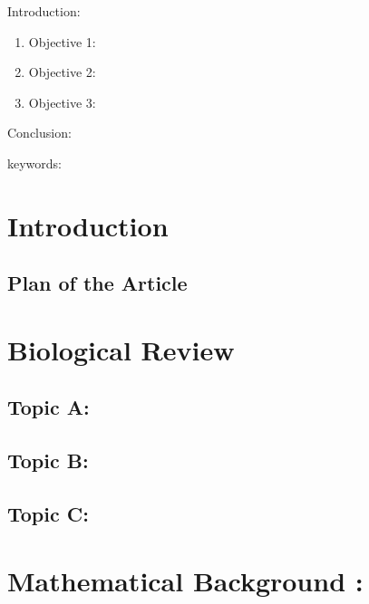 

\twocolumn
\scriptsize
\begin{frontmatter}
		\title{}
		\author{}
		\address{The Mathematical Learning Space}
\end{frontmatter}	

Introduction:
\begin{enumerate}
\item Objective 1:
\item Objective 2:
\item Objective 3:
\end{enumerate}
Conclusion:

keywords:


\section{Introduction}

\subsection{Plan of the Article}

\begin{enumerate}
\end{enumerate}


\section{Biological Review}

\subsection{Topic A:}

\subsection{Topic B:}

\subsection{Topic C:}


\section{Mathematical Background : }


